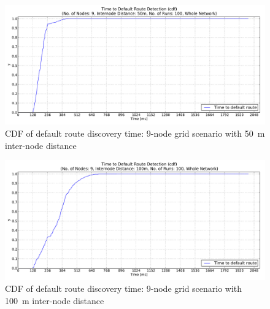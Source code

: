 \begin{figure}[htpb]
  \begin{center}
   \vspace{-20pt}
    \leavevmode
      \includegraphics[scale=0.38]
      {Pics/results/9/MRHOF/grid/dist50_montecarlo_cdf_hist.pdf}
   \caption{CDF of default route discovery time: 9-node grid scenario with 50~m inter-node distance}
   \label{fig:9_MRHOF_grid_50_cdf}
  \end{center}
\end{figure}

\begin{figure}[htpb]
  \begin{center}
   \vspace{-20pt}
    \leavevmode
      \includegraphics[scale=0.38]
      {Pics/results/9/MRHOF/grid/dist100_montecarlo_cdf_hist.pdf}
   \caption{CDF of default route discovery time: 9-node grid scenario with 100~m inter-node distance}
   \label{fig:9_MRHOF_grid_100_cdf}
  \end{center}
\end{figure}


